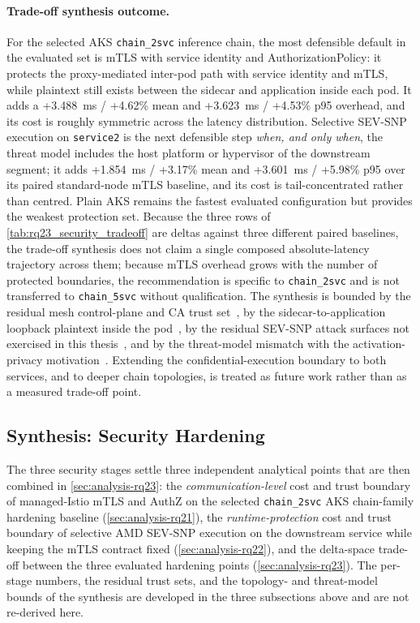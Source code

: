 \paragraph{Trade-off synthesis outcome.}
For the selected AKS \texttt{chain\_2svc} inference chain, the most
defensible default in the evaluated set is mTLS with service identity
and AuthorizationPolicy: it protects the proxy-mediated inter-pod path
with service identity and mTLS, while plaintext still exists between the
sidecar and application inside each pod. It adds a +3.488~ms / +4.62\%
mean and +3.623~ms / +4.53\% p95 overhead, and its cost is roughly
symmetric across the latency distribution. Selective
SEV-SNP execution on \texttt{service2} is the next defensible step
\emph{when, and only when}, the threat model includes the host platform
or hypervisor of the downstream segment; it adds +1.854~ms / +3.17\%
mean and +3.601~ms / +5.98\% p95 over its paired standard-node mTLS
baseline, and its cost is tail-concentrated rather than centred. Plain
AKS remains the fastest evaluated configuration but provides the weakest
protection set. Because the three rows of
\cref{tab:rq23_security_tradeoff} are deltas against three different
paired baselines, the trade-off synthesis does not claim a single composed absolute-latency
trajectory across them; because mTLS overhead grows with the number of
protected boundaries, the recommendation is specific to
\texttt{chain\_2svc} and is not transferred to \texttt{chain\_5svc}
without qualification. The synthesis is bounded by the residual mesh
control-plane and CA trust set~\cite{poudel2025mazu}, by the
sidecar-to-application loopback plaintext inside the
pod~\cite{meshinsight_socc23}, by the residual SEV-SNP attack surfaces
not exercised in this thesis~\cite{schluter2024_heckler}, and by the
threat-model mismatch with the activation-privacy
motivation~\cite{he2021_attacking_collaborative}. Extending the
confidential-execution boundary to both services, and to deeper chain
topologies, is treated as future work rather than as a measured
trade-off point.

\subsection{Synthesis: Security Hardening}
\label{sec:analysis-security-synthesis}

The three security stages settle three independent analytical points
that are then combined in \cref{sec:analysis-rq23}: the
\emph{communication-level} cost and trust boundary of managed-Istio mTLS
and AuthZ on the selected \texttt{chain\_2svc} AKS chain-family hardening
baseline (\cref{sec:analysis-rq21}), the
\emph{runtime-protection} cost and trust boundary of selective AMD
SEV-SNP execution on the downstream service while keeping the mTLS
contract fixed (\cref{sec:analysis-rq22}), and the delta-space
trade-off between the three evaluated hardening points
(\cref{sec:analysis-rq23}). The per-stage numbers, the residual trust
sets, and the topology- and threat-model bounds of the synthesis are
developed in the three subsections above and are not re-derived here.
